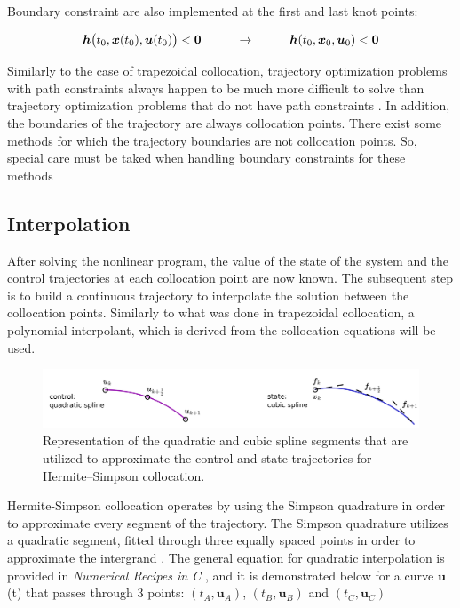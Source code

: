 \documentclass{thesisreport}
\begin{document}
\noindent Boundary constraint are also implemented at the first and last knot points:

\begin{equation}
\bm{h}\big(t_0,\bm{x}(t_0),\bm{u}(t_0)\big) < \bm{0} \text{\hspace{1cm}} \rightarrow \text{\hspace{1cm}} \bm{h}(t_0,\bm{x}_0,\bm{u}_0) <\bm{0}
\end{equation}

\noindent Similarly to the case of trapezoidal collocation, trajectory optimization problems with path constraints always happen to be much more difficult to solve than trajectory optimization problems that do not have path constraints \cite{Betts2010}. In addition, the boundaries of the trajectory are always collocation points. There exist some methods for which the trajectory boundaries are not collocation points. So, special care must be taked when handling boundary constraints for these methods \cite{Benson2006, Garg2010}
  
\subsection{Interpolation}
 
 After solving the nonlinear program, the value of the state of the system and the control trajectories at each collocation point are now known. The subsequent step is to build a continuous trajectory to interpolate the solution between the collocation points. Similarly to what was done in trapezoidal collocation, a polynomial interpolant, which is derived from the collocation equations will be used.
  
 \begin{figure}[h]
 \centering 
 \includegraphics[width=\textwidth]{Images/Trajectory/Hermite-Simpson_Rule}
 \caption{Representation of the quadratic and cubic spline segments that are utilized to approximate the control and state trajectories for Hermite–Simpson collocation.}
 \label{Hermite-Simpson_figure_}
 \end{figure}

Hermite-Simpson collocation operates by using the Simpson quadrature in order to approximate every segment of the trajectory. 
The Simpson quadrature utilizes a quadratic segment, fitted through three equally spaced points in order to approximate the intergrand \cite{Kelly2017}. The general equation for quadratic interpolation is provided in \textit{Numerical Recipes in C} \cite{Press1992}, and it is demonstrated below for a curve $\bm{u}$(t) that passes through 3 points: $(t_A,\bm{u}_A)$, $(t_B,\bm{u}_B)$ and $(t_C,\bm{u}_C)$
\end{document}
